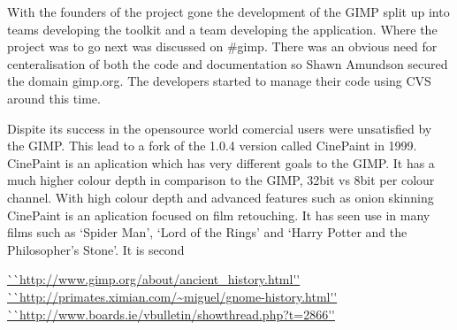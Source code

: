 \documentclass[a4 paper, 12pt]{article}
\begin{document}
	With the founders of the project gone the development of the GIMP split up
	into teams developing the toolkit and a team developing the application.
	Where the project was to go next was discussed on #gimp. There was an
	obvious need for centeralisation of both the code and documentation so Shawn
	Amundson secured the domain gimp.org. The developers started to manage their
	code using CVS around this time.

	Dispite its success in the opensource world comercial users were unsatisfied
	by the GIMP. This lead to a fork of the 1.0.4 version called CinePaint in
	1999.\cite{release} CinePaint is an aplication which has very different
	goals to the GIMP. It has a much higher colour depth in comparison to the
	GIMP, 32bit vs 8bit per colour channel. With high colour depth and advanced
	features such as onion skinning CinePaint is an aplication focused on film
	retouching. It has seen use in many films such as `Spider Man', `Lord of the
	Rings' and `Harry Potter and the Philosopher's Stone'. It is second
	
	\begin{thebibliography}{12}
	\url{``http://www.gimp.org/about/ancient_history.html''}
	\url{``http://primates.ximian.com/~miguel/gnome-history.html''}
	\url{``http://www.boards.ie/vbulletin/showthread.php?t=2866''}
\end{thebibliography}
\end{document}
